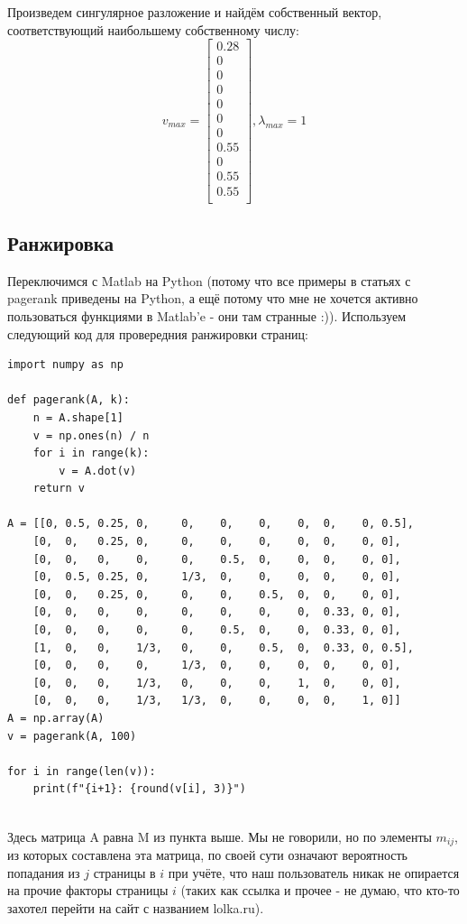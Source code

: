 \documentclass[a4paper,hidelinks,14pt]{extarticle}
\begin{document}
	Произведем сингулярное разложение и найдём собственный вектор, соответствующий наибольшему собственному числу:
	$$
	v_{max} = \begin{bmatrix}
		0.28 \\
		0 \\
		0 \\ 
		0 \\
		0 \\
		0 \\
		0 \\
		0.55 \\
		0 \\
		0.55 \\
		0.55\\
	\end{bmatrix}, \lambda_{max}=1
	$$
	
	\subsection{Ранжировка}
	Переключимся с Matlab на Python (потому что все примеры в статьях с pagerank приведены на Python, а ещё потому что мне не хочется активно пользоваться функциями в Matlab'e - они там странные :)). Используем следующий код для провередния ранжировки страниц:
	\begin{lstlisting}
import numpy as np

def pagerank(A, k):
	n = A.shape[1]
	v = np.ones(n) / n
	for i in range(k):
		v = A.dot(v)
	return v

A = [[0, 0.5, 0.25, 0,     0,    0,    0,    0,  0,    0, 0.5],
	[0,  0,   0.25, 0,     0,    0,    0,    0,  0,    0, 0],
	[0,  0,   0,    0,     0,    0.5,  0,    0,  0,    0, 0],
	[0,  0.5, 0.25, 0,     1/3,  0,    0,    0,  0,    0, 0],
	[0,  0,   0.25, 0,     0,    0,    0.5,  0,  0,    0, 0],
	[0,  0,   0,    0,     0,    0,    0,    0,  0.33, 0, 0],
	[0,  0,   0,    0,     0,    0.5,  0,    0,  0.33, 0, 0],
	[1,  0,   0,    1/3,   0,    0,    0.5,  0,  0.33, 0, 0.5],
	[0,  0,   0,    0,     1/3,  0,    0,    0,  0,    0, 0],
	[0,  0,   0,    1/3,   0,    0,    0,    1,  0,    0, 0],
	[0,  0,   0,    1/3,   1/3,  0,    0,    0,  0,    1, 0]]
A = np.array(A)
v = pagerank(A, 100)

for i in range(len(v)):
	print(f"{i+1}: {round(v[i], 3)}")
		
	\end{lstlisting}
	
	Здесь матрица A равна M из пункта выше. Мы не говорили, но по элементы $m_{ij}$, из которых составлена эта матрица, по своей сути означают вероятность попадания из $j$ страницы в $i$ при учёте, что наш пользователь никак не опирается на прочие факторы страницы $i$ (таких как ссылка и прочее - не думаю, что кто-то захотел перейти на сайт с названием lolka.ru).
	
\end{document}
